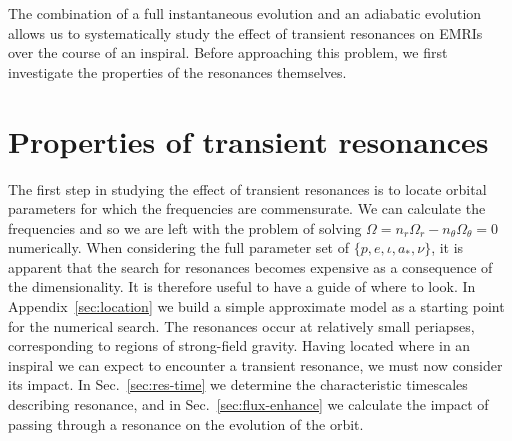 \documentclass[aps,prd,amsfonts,amssymb,amsmath,nofootinbib,showpacs,superscriptaddress,twocolumn,floatfix]{revtex4-1}
\newcommand{\eqnref}[1]{Eq.~(\ref{eq:#1})}
\newcommand{\secref}[1]{Sec.~\ref{sec:#1}}
\newcommand{\apref}[1]{Appendix~\ref{sec:#1}}
\newcommand{\dd}{\ensuremath{\mathrm{d}}}
\newcommand{\diff}[2]{\ensuremath{\dfrac{\dd {#1}}{\dd {#2}}}}
\begin{document}

The combination of a full instantaneous evolution and an adiabatic evolution allows us to systematically study the effect of transient resonances on EMRIs over the course of an inspiral. Before approaching this problem, we first investigate the properties of the resonances themselves.


\section{Properties of transient resonances}
\label{sec:properties}

The first step in studying the effect of transient resonances is to locate orbital parameters for which the frequencies are commensurate. We can calculate the frequencies and so we are left with the problem of solving $\Omega = n_r \Omega_r - n_\theta \Omega_\theta = 0$ numerically. When considering the full parameter set of $\{p,e,\iota,a_\ast,\nu\}$, it is apparent that the search for resonances becomes expensive as a consequence of the dimensionality. It is therefore useful to have a guide of where to look. In \apref{location} we build a simple approximate model as a starting point for the numerical search. The resonances occur at relatively small periapses, corresponding to regions of strong-field gravity. Having located where in an inspiral we can expect to encounter a transient resonance, we must now consider its impact. In \secref{res-time} we determine the characteristic timescales describing resonance, and in \secref{flux-enhance} we calculate the impact of passing through a resonance on the evolution of the orbit.
\end{document}
